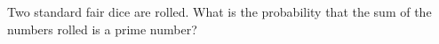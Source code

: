 Two standard fair dice are rolled. What is the probability that the sum of the numbers rolled is a prime number?
